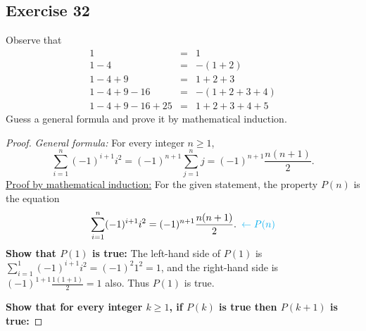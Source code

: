 \documentclass[14pt]{extarticle}
\newcommand{\dps}{\displaystyle}
\newcommand{\from}{\leftarrow}
\newcommand{\cy}{\color{cyan}}
\begin{document}
\subsection{Exercise 32}
Observe that
\[
\begin{array}{rcl}
1 & = & 1 \\
1 - 4 & = & -(1+2) \\
1 - 4 + 9 & = & 1+2+3 \\
1 - 4 + 9 - 16 & = & -(1+2+3+4) \\
1 - 4 + 9 - 16 + 25 & = & 1+2+3+4+5
\end{array}
\]
Guess a general formula and prove it by mathematical induction.

\begin{proof}
{\it General formula:} For every integer $n \geq 1$,
\[
\dps \sum_{i=1}^n (-1)^{i+1}i^2 = (-1)^{n+1}\sum_{j=1}^{n}j = (-1)^{n+1}\frac{n(n+1)}{2}.
\]
\underline{Proof by mathematical induction:}
For the given statement, the property $P(n)$ is the equation
\[
\dps \sum_{i=1}^n (-1)^{i+1}i^2 = (-1)^{n+1}\frac{n(n+1)}{2}. \,\,\, {\cy \from P(n)}
\]
{\bf Show that $P(1)$ is true:} The left-hand side of $P(1)$ is $\dps \sum_{i=1}^1 (-1)^{i+1}i^2 = (-1)^2 1^2 = 1$, and the right-hand side is $\dps (-1)^{1+1}\frac{1(1+1)}{2} = 1$ also. Thus $P(1)$ is true.

{\bf Show that for every integer $k \geq 1$, if $P(k)$ is true then $P(k + 1)$ is true:}


\end{proof}
\end{document}
